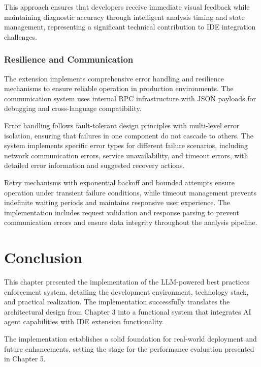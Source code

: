\begin{spacing}{1.2}
This approach ensures that developers receive immediate visual feedback while maintaining diagnostic accuracy through intelligent analysis timing and state management, representing a significant technical contribution to IDE integration challenges.

\subsubsection{Resilience and Communication}
The extension implements comprehensive error handling and resilience mechanisms to ensure reliable operation in production environments. The communication system uses internal RPC infrastructure with JSON payloads for debugging and cross-language compatibility.

Error handling follows fault-tolerant design principles with multi-level error isolation, ensuring that failures in one component do not cascade to others. The system implements specific error types for different failure scenarios, including network communication errors, service unavailability, and timeout errors, with detailed error information and suggested recovery actions.

Retry mechanisms with exponential backoff and bounded attempts ensure operation under transient failure conditions, while timeout management prevents indefinite waiting periods and maintains responsive user experience. The implementation includes request validation and response parsing to prevent communication errors and ensure data integrity throughout the analysis pipeline.


\section*{Conclusion}
This chapter presented the implementation of the LLM-powered best practices enforcement system, detailing the development environment, technology stack, and practical realization. The implementation successfully translates the architectural design from Chapter 3 into a functional system that integrates AI agent capabilities with IDE extension functionality.

The implementation establishes a solid foundation for real-world deployment and future enhancements, setting the stage for the performance evaluation presented in Chapter 5.

\end{spacing}